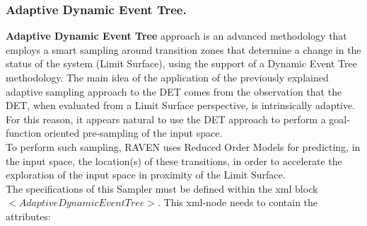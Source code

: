 \subsubsection{Adaptive Dynamic Event Tree.}
\label{subsubsubsec:ADET}
\textbf{Adaptive Dynamic Event Tree} approach is an advanced methodology that employs a smart sampling around transition zones that determine a change in the status of the system (Limit Surface), using the support of a Dynamic Event Tree methodology. 
The main idea of the application of the previously explained adaptive sampling approach to the DET comes from the observation that the DET, when evaluated from a Limit Surface perspective, is intrinsically adaptive.
For this reason, it appears natural to use the DET approach to perform a goal-function oriented pre-sampling of the input space. 
\\To perform such sampling, RAVEN uses Reduced Order Models for predicting, in the input space, the location(s) of these transitions, in order to accelerate the exploration of the input space in proximity of the Limit Surface.
\\ The specifications of this Sampler must be defined within the xml block $<AdaptiveDynamicEventTree>$. This xml-node needs to contain the attributes:
